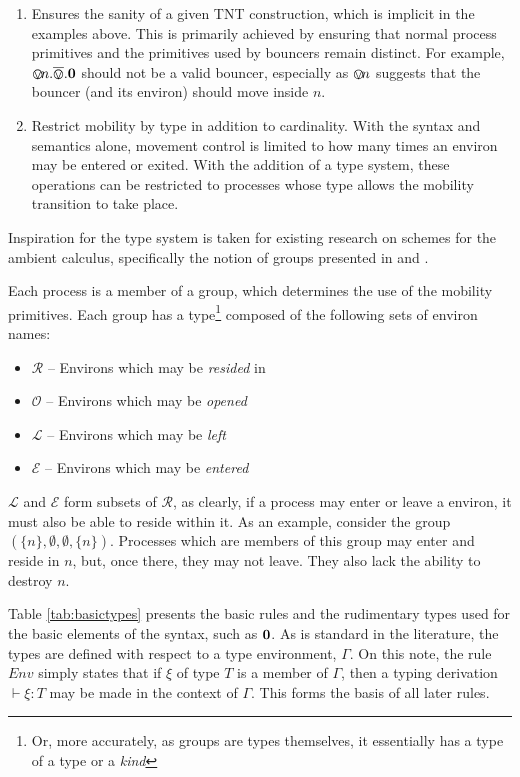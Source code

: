 \documentclass[orivec]{llncs}
\begin{document}
\begin{enumerate}
\item Ensures the sanity of a given TNT construction, which is
  implicit in the examples above.  This is primarily achieved by
  ensuring that normal process primitives and the primitives used by
  bouncers remain distinct.  For example,
  $\varovee\!n.\overline{\varovee}.\textbf{0}$ should not be a valid bouncer,
  especially as $\varovee\!n$ suggests that the bouncer (and its environ)
  should move inside $n$.
\item Restrict mobility by type in addition to cardinality.  With the
  syntax and semantics alone, movement control is limited to how many
  times an environ may be entered or exited.  With the addition of a type
  system, these operations can be restricted to processes whose type
  allows the mobility transition to take place.
\end{enumerate}

Inspiration for the type system is taken for existing research on
schemes for the ambient calculus, specifically the notion of groups
presented in \cite{ambienttypes} and \cite{m3}.

Each process is a member of a group, which determines the use of the
mobility primitives.  Each group has a type\footnote{Or, more
  accurately, as groups are types themselves, it essentially has a
  type of a type or a \emph{kind}} composed of the following sets of
environ names:

\begin{itemize}
\item $\mathscr{R}$ -- Environs which may be \emph{resided} in
\item $\mathscr{O}$ -- Environs which may be \emph{opened}
\item $\mathscr{L}$ -- Environs which may be \emph{left}
\item $\mathscr{E}$ -- Environs which may be \emph{entered}
\end{itemize}

$\mathscr{L}$ and $\mathscr{E}$ form subsets of $\mathscr{R}$, as
clearly, if a process may enter or leave a environ, it must also be
able to reside within it.  As an example, consider the group
$(\{n\},\emptyset, \emptyset,\{n\})$.  Processes which are members of
this group may enter and reside in $n$, but, once there, they may not
leave.  They also lack the ability to destroy $n$.

Table \ref{tab:basictypes} presents the basic rules and the rudimentary
types used for the basic elements of the syntax, such as $\textbf{0}$.  As is
standard in the literature, the types are defined with respect to a type
environment, $\Gamma$.  On this note, the rule $Env$ simply states that
if $\xi$ of type $T$ is a member of $\Gamma$, then a typing derivation
$\vdash \xi : T$ may be made in the context of $\Gamma$.  This forms the
basis of all later rules.
\end{document}

